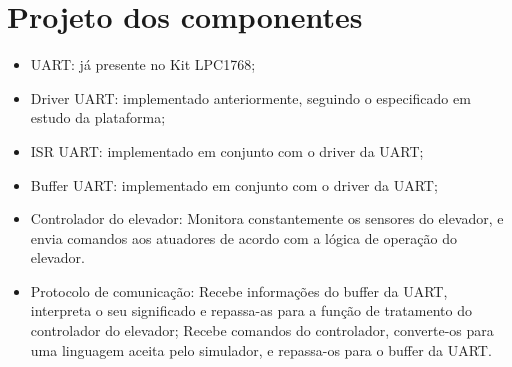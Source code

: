 \chapter{Projeto dos componentes}

\begin{itemize}
	\item UART: já presente no Kit LPC1768;
	\item Driver UART: implementado anteriormente, seguindo o especificado em estudo da plataforma;
	\item ISR UART: implementado em conjunto com o driver da UART;
	\item Buffer UART: implementado em conjunto com o driver da UART;
	\item Controlador do elevador: Monitora constantemente os sensores do elevador, e envia comandos aos atuadores de acordo com a lógica de operação do elevador. 
	\item Protocolo de comunicação: Recebe informações do buffer da UART, interpreta o seu significado e repassa-as para a função de tratamento do controlador do elevador; Recebe comandos do controlador, converte-os para uma linguagem aceita pelo simulador, e repassa-os para o buffer da UART.
\end{itemize}



